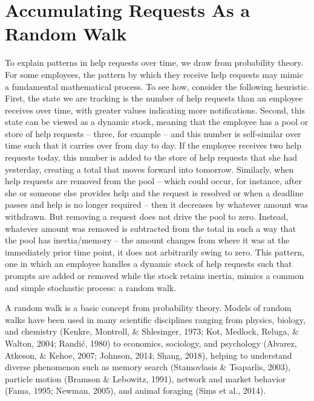 \documentclass[english,,man]{apa6}
\theoremstyle{definition}
\theoremstyle{definition}
\theoremstyle{definition}
\theoremstyle{remark}
\begin{document}
\hypertarget{accumulating-requests-as-a-random-walk}{%
\section{Accumulating Requests As a Random
Walk}\label{accumulating-requests-as-a-random-walk}}

To explain patterns in help requests over time, we draw from probability
theory. For some employees, the pattern by which they receive help
requests may mimic a fundamental mathematical process. To see how,
consider the following heuristic. First, the state we are tracking is
the number of help requests than an employee receives over time, with
greater values indicating more notifications. Second, this state can be
viewed as a dynamic stock, meaning that the employee has a pool or store
of help requests -- three, for example -- and this number is
self-similar over time such that it carries over from day to day. If the
employee receives two help requests today, this number is added to the
store of help requests that she had yesterday, creating a total that
moves forward into tomorrow. Similarly, when help requests are removed
from the pool -- which could occur, for instance, after she or someone
else provides help and the request is resolved or when a deadline passes
and help is no longer required -- then it decreases by whatever amount
was withdrawn. But removing a request does not drive the pool to zero.
Instead, whatever amount was removed is subtracted from the total in
such a way that the pool has inertia/memory -- the amount changes from
where it was at the immediately prior time point, it does not
arbitrarily swing to zero. This pattern, one in which an employee
handles a dynamic stock of help requests such that prompts are added or
removed while the stock retains inertia, mimics a common and simple
stochastic process: a random walk.

A random walk is a basic concept from probability theory. Models of
random walks have been used in many scientific disciplines ranging from
physics, biology, and chemistry (Kenkre, Montroll, \& Shlesinger, 1973;
Kot, Medlock, Reluga, \& Walton, 2004; Randić, 1980) to economics,
sociology, and psychology (Alvarez, Atkeson, \& Kehoe, 2007; Johnson,
2014; Shang, 2018), helping to understand diverse phenomenon such as
memory search (Stamovlasis \& Tsaparlis, 2003), particle motion (Bramson
\& Lebowitz, 1991), network and market behavior (Fama, 1995; Newman,
2005), and animal foraging (Sims et al., 2014).
\end{document}
